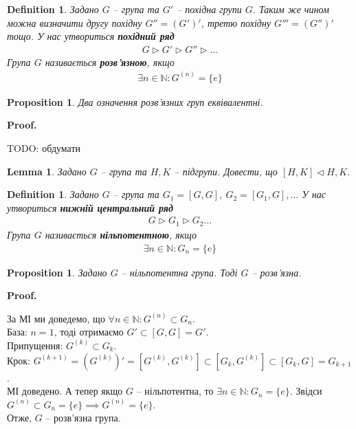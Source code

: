 \documentclass[a4paper, 10pt]{article}
\makeatletter
\theoremstyle{theoremdd}
\theoremstyle{theoremdd}
\newtheorem{definition}[theorem]{Definition}
\theoremstyle{theoremdd}
\theoremstyle{theoremdd}
\theoremstyle{theoremdd}
\theoremstyle{theoremdd}
\theoremstyle{theoremdd}
\theoremstyle{theoremdd}
\theoremstyle{theoremdd}
\newtheorem{proposition}[theorem]{Proposition}
\theoremstyle{theoremdd}
\theoremstyle{theoremdd}
\theoremstyle{theoremdd}
\theoremstyle{theoremdd}
\newtheorem{lemma}[theorem]{Lemma}
\theoremstyle{theoremdd}
\theoremstyle{theoremdd}
\renewenvironment{proof}[1][Proof.\\]{\par
\pushQED{\hfill \qed}%
\normalfont \topsep6\p@\@plus6\p@\relax
\trivlist
\item\relax
{\bfseries
#1\@addpunct{.}}\hspace\labelsep\ignorespaces
}{%
\popQED\endtrivlist\@endpefalse
}
\makeatother
\begin{document}
\begin{definition}
Задано $G$ -- група та $G'$ -- похідна групи $G$. Таким же чином можна визначити другу похідну $G'' = (G')'$, третю похідну $G''' = (G'')'$ тощо. У нас утвориться \textbf{похідний ряд}
\begin{align*}
G \triangleright G' \triangleright G'' \triangleright \dots
\end{align*}
Група $G$ називається \textbf{розв'язною}, якщо
\begin{align*}
\exists n \in \mathbb{N}: G^{(n)} = \{e\}
\end{align*}
\end{definition}

\begin{proposition}
Два означення розв'язних груп еквівалентні.
\end{proposition}

\begin{proof}
TODO: обдумати
\end{proof}

\begin{lemma}
Задано $G$ -- група та $H,K$ -- підгрупи. Довести, що $[H,K] \triangleleft H,K$.
\end{lemma}

\begin{definition}
Задано $G$ -- група та $G_1 = [G,G],\ G_2 = [G_1,G], \dots$ У нас утвориться \textbf{нижній центральний ряд}
\begin{align*}
G \triangleright G_1 \triangleright G_2 \dots
\end{align*}
Група $G$ називається \textbf{нільпотентною}, якщо
\begin{align*}
\exists n \in \mathbb{N}: G_n = \{e\}
\end{align*}
\end{definition}

\begin{proposition}
Задано $G$ -- нільпотентна група. Тоді $G$ -- розв'язна.
\end{proposition}

\begin{proof}
За МІ ми доведемо, що $\forall n \in \mathbb{N}: G^{(n)} \subset G_n$.\\
База: $n = 1$, тоді отримаємо $G' \subset [G,G] = G'$.\\
Припущення: $G^{(k)} \subset G_k$.\\
Крок: $G^{(k+1)} = (G^{(k)})' = [G^{(k)}, G^{(k)}] \subset [G_k, G^{(k)}] \subset [G_k,G] = G_{k+1}$.\\
МІ доведено. А тепер якщо $G$ -- нільпотентна, то $\exists n \in \mathbb{N}: G_n = \{e\}$. Звідси $G^{(n)} \subset G_n = \{e\} \implies G^{(n)} = \{e\}$.\\
Отже, $G$ -- розв'язна група.
\end{proof}
\end{document}
